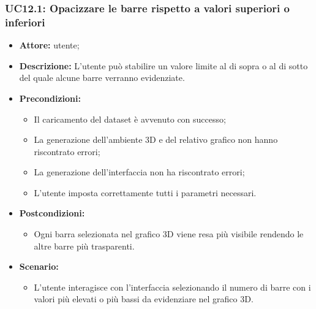 \subsubsection{UC12.1: Opacizzare le barre rispetto a valori superiori o inferiori}
\begin{itemize}    
    \item \textbf{Attore:} utente;
    \item \textbf{Descrizione:} L'utente può stabilire un valore limite al di sopra o al di sotto del quale alcune barre verranno evidenziate.
    \item \textbf{Precondizioni:}    
        \begin{itemize}
            \item Il caricamento del dataset è avvenuto con successo;
            \item La generazione dell'ambiente 3D e del relativo grafico non hanno riscontrato errori;
            \item La generazione dell'interfaccia non ha riscontrato errori;
            \item L'utente imposta correttamente tutti i parametri necessari.
        \end{itemize}    
    \item \textbf{Postcondizioni:}
        \begin{itemize}
            \item Ogni barra selezionata nel grafico 3D viene resa più visibile rendendo le altre barre più trasparenti.
        \end{itemize}    
    \item \textbf{Scenario:} 
        \begin{itemize}
            \item L'utente interagisce con l'interfaccia selezionando il numero di barre con i valori più elevati o più bassi da evidenziare nel grafico 3D.
        \end{itemize}
\end{itemize}
